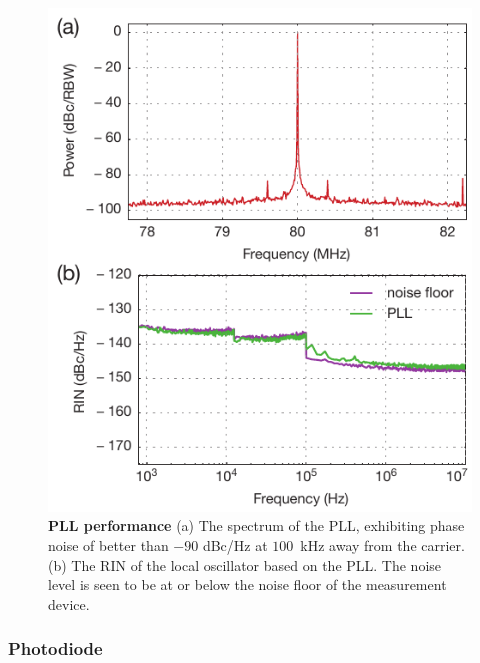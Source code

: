\documentclass[twocolumn,aps,pra,showpacs,preprintnumbers,bibnotes]{revtex4-1}
\begin{document}
\begin{figure}
  \begin{center}
    \includegraphics{Figure7.pdf}
    \caption{\textbf{PLL performance} (a) The spectrum of the PLL, exhibiting phase noise of better than $-90$ dBc/Hz at $100$~kHz away from the carrier. (b) The RIN of the local oscillator based on the PLL. The noise level is seen to be at or below the noise floor of the measurement device.}\label{fig:pll}
  \end{center}
\end{figure}

\subsubsection{Photodiode}
\end{document}
